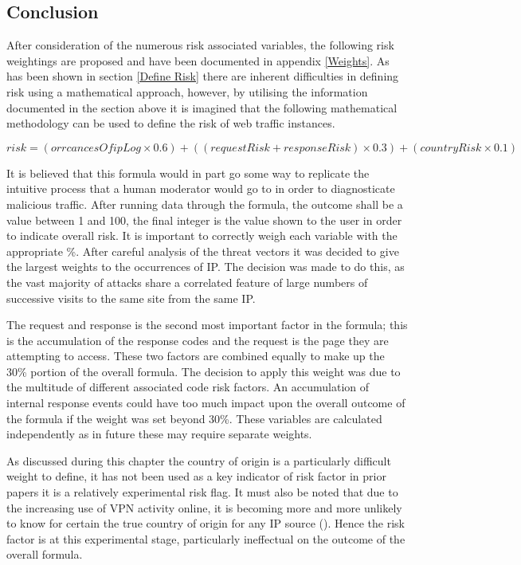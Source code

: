 \subsection{Conclusion}

After consideration of the numerous risk associated variables, the following risk weightings are proposed and have been documented in appendix \ref{Weights}. As has been shown in section \ref{Define Risk} there are inherent difficulties in defining risk using a mathematical approach, however, by utilising the information documented in the section above it is imagined that the following mathematical methodology can be used to define the risk of web traffic instances. 

\[risk = (orrcancesOfipLog \times 0.6) + ((requestRisk+responseRisk) \times 0.3) + (countryRisk \times  0.1) \]

It is believed that this formula would in part go some way to replicate the intuitive process that a human moderator would go to in order to diagnosticate malicious traffic. After running data through the formula, the outcome shall be a value between 1 and 100, the final integer is the value shown to the user in order to indicate overall risk. It is important to correctly weigh each variable with the appropriate \%. After careful analysis of the threat vectors it was decided to give the largest weights to the occurrences of IP. The decision was made to do this, as the vast majority of attacks share a correlated feature of large numbers of successive visits to the same site from the same IP. 

The request and response is the second most important factor in the formula; this is the accumulation of the response codes and the request is the page they are attempting to access. These two factors are combined equally to make up the 30\% portion of the overall formula. The decision to apply this weight was due to the multitude of different associated code risk factors. An accumulation of internal response events could have too much impact upon the overall outcome of the formula if the weight was set beyond 30\%. These variables are calculated independently as in future these may require separate weights.

As discussed during this chapter the country of origin is a particularly difficult weight to define, it has not been used as a key indicator of risk factor in prior papers it is a relatively experimental risk flag. It must also be noted that due to the increasing use of VPN activity online, it is becoming more and more unlikely to know for certain the true country of origin for any IP source (\cite{GoGlobe}). Hence the risk factor is at this experimental stage, particularly ineffectual on the outcome of the overall formula.

